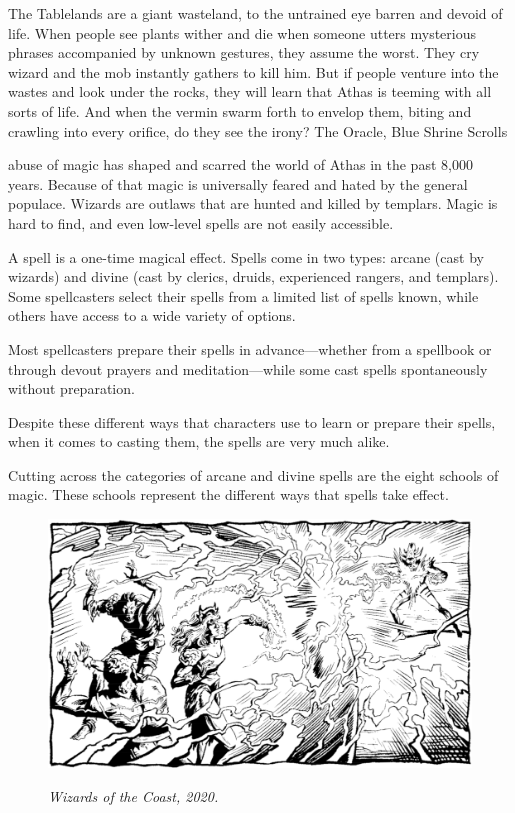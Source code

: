 {The Tablelands are a giant wasteland, to the untrained eye barren and devoid of life. When people see plants wither and die when someone utters mysterious phrases accompanied by unknown gestures, they assume the worst. They cry wizard and the mob instantly gathers to kill him. But if people venture into the wastes and look under the rocks, they will learn that Athas is teeming with all sorts of life. And when the vermin swarm forth to envelop them, biting and crawling into every orifice, do they see the irony?}
{The Oracle, Blue Shrine Scrolls}

 abuse of magic has shaped and scarred the world of Athas in the past 8,000 years. Because of that magic is universally feared and hated by the general populace. Wizards are outlaws that are hunted and killed by templars. Magic is hard to find, and even low-level spells are not easily accessible.

A spell is a one-time magical effect. Spells come in two types: arcane (cast by wizards) and divine (cast by clerics, druids, experienced rangers, and templars). Some spellcasters select their spells from a limited list of spells known, while others have access to a wide variety of options.

Most spellcasters prepare their spells in advance---whether from a spellbook or through devout prayers and meditation---while some cast spells spontaneously without preparation.

Despite these different ways that characters use to learn or prepare their spells, when it comes to casting them, the spells are very much alike.

Cutting across the categories of arcane and divine spells are the eight schools of magic. These schools represent the different ways that spells take effect.

\begin{figure}[t!]
\centering
\includegraphics[width=\textwidth]{images/magic-1.png}
\par\textit{\small\textcopyright Wizards of the Coast, 2020.}
\end{figure}

